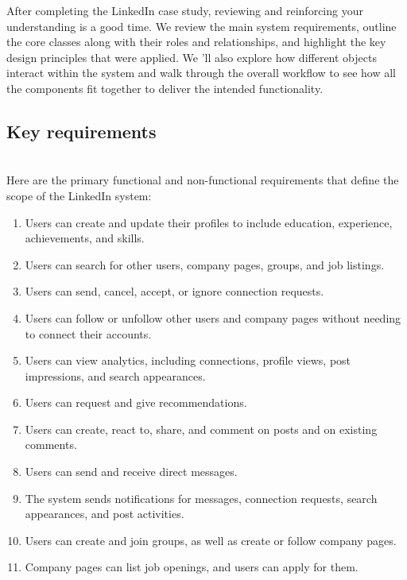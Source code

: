 

After completing the LinkedIn case study, reviewing and reinforcing your understanding is a good time. We review the main system requirements, outline the core classes along with their roles and relationships, and highlight the key design principles that were applied. We 'll also explore how different objects interact within the system and walk through the overall workflow to see how all the components fit together to deliver the intended functionality.

\subsection{Key requirements}\label{kkRxjOY2XblY9LlVCgJ15}
\\
Here are the primary functional and non-functional requirements that define the scope of the LinkedIn system:

\begin{enumerate}
\item
Users can create and update their profiles to include education, experience, achievements, and skills.
\item
Users can search for other users, company pages, groups, and job listings.
\item
Users can send, cancel, accept, or ignore connection requests.
\item
Users can follow or unfollow other users and company pages without needing to connect their accounts.
\item
Users can view analytics, including connections, profile views, post impressions, and search appearances.
\item
Users can request and give recommendations.
\item
Users can create, react to, share, and comment on posts and on existing comments.
\item
Users can send and receive direct messages.
\item
The system sends notifications for messages, connection requests, search appearances, and post activities.
\item
Users can create and join groups, as well as create or follow company pages.
\item
Company pages can list job openings, and users can apply for them.
\end{enumerate}

